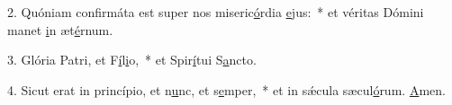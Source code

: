 2. Quóniam confirmáta est super nos miseric\uline{ó}rdia \uline{e}jus:~* et véritas Dómini manet \uline{i}n æt\uline{é}rnum.\par 
3. Glória Patri, et F\uline{í}l\uline{i}o,~* et Spir\uline{í}tui S\uline{a}ncto.\par 
4. Sicut erat in princípio, et n\uline{u}nc, et s\uline{e}mper,~* et in sǽcula sæcul\uline{ó}rum. \uline{A}men.\par 
